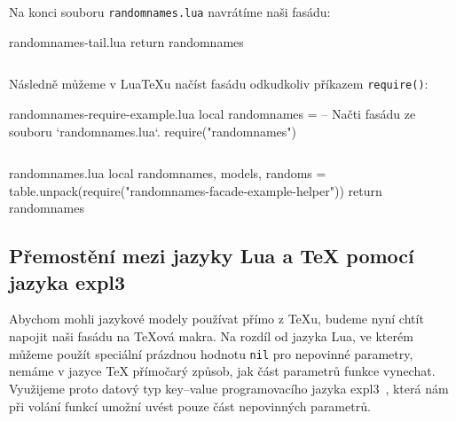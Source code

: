 \documentclass{csbulletin}
\newcommand\myinputminted[3][]{%
  \inputminted[#1]{#2}{#3}%
}
\newcommand\myinputminted[3][]{%
  \inputminted[#1]{#2}{code-placeholder.#2}%
}
\begin{document}
Na konci souboru \texttt{randomnames.lua} navrátíme naši fasádu:

\begin{filecontents}{randomnames-tail.lua}
return randomnames
\end{filecontents}
\myinputminted{lua}{randomnames-tail.lua}

\noindent
Následně můžeme v Lua\TeX u načíst fasádu odkudkoliv příkazem \texttt{require()}:

\begin{filecontents}{randomnames-require-example.lua}
local randomnames =  -- Načti fasádu ze souboru `randomnames.lua`.
   require("randomnames")
\end{filecontents}
\myinputminted[linenos=false]{lua}{randomnames-require-example.lua}

\begin{filecontents}{randomnames.lua}
local randomnames, models, randoms = table.unpack(require("randomnames-facade-example-helper"))
return randomnames
\end{filecontents}

\subsection{Přemostění mezi jazyky Lua a \TeX{} pomocí jazyka expl3}
\label{sec:rozhrani-premosteni}

Abychom mohli jazykové modely používat přímo z \TeX u, budeme nyní chtít napojit naši fasádu na \TeX ová makra. Na rozdíl od jazyka Lua, ve kterém můžeme použít speciální prázdnou hodnotu \texttt{nil} pro nepovinné parametry, nemáme v jazyce \TeX{} přímočarý způsob, jak část parametrů funkce vynechat. Využijeme proto datový typ key--value programovacího jazyka expl3~\cite[kapitola~26]{latex2023interfaces}, která nám při volání funkcí umožní uvést pouze část nepovinných parametrů.
\end{document}
